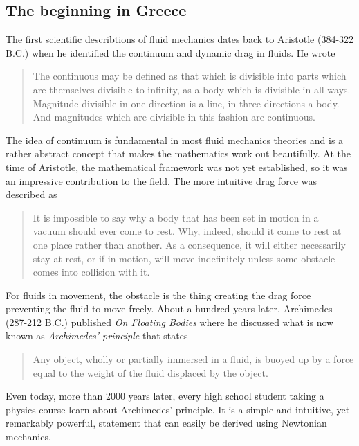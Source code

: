 \subsection{The beginning in Greece}
The first scientific describtions of fluid mechanics dates back to Aristotle (384-322 B.C.) when he identified the continuum and dynamic drag in fluids.\cite{book:fluid_history} He wrote
\begin{quotation}
The continuous may be defined as that which is divisible into parts which are themselves divisible to infinity, as a body which is divisible in all ways. Magnitude divisible in one direction is a line, in three directions a body. And magnitudes which are divisible in this fashion are continuous. 
\end{quotation}
The idea of continuum is fundamental in most fluid mechanics theories and is a rather abstract concept that makes the mathematics work out beautifully. At the time of Aristotle, the mathematical framework was not yet established, so it was an impressive contribution to the field. The more intuitive drag force was described as
\begin{quotation}
It is impossible to say why a body that has been set in motion in a vacuum should ever come to rest. Why, indeed, should it come to rest at one place rather than another. As a consequence, it will either necessarily stay at rest, or if in motion, will move indefinitely unless some obstacle comes into collision with it.
\end{quotation}
For fluids in movement, the obstacle is the thing creating the drag force preventing the fluid to move freely. About a hundred years later, Archimedes (287-212 B.C.) published \textit{On Floating Bodies} where he discussed what is now known as \textit{Archimedes' principle} that states
\begin{quotation}
Any object, wholly or partially immersed in a fluid, is buoyed up by a force equal to the weight of the fluid displaced by the object.
\end{quotation}
Even today, more than 2000 years later, every high school student taking a physics course learn about Archimedes' principle. It is a simple and intuitive, yet remarkably powerful, statement that can easily be derived using Newtonian mechanics. 

